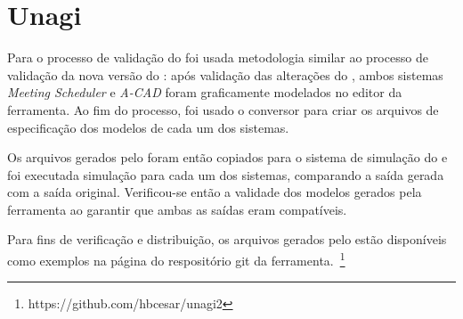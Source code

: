 \section{Unagi}

Para o processo de validação do \unagi foi usada metodologia similar ao processo de validação da nova versão do \zanshin: após validação das alterações do \framework, ambos sistemas \textit{Meeting Scheduler} e \textit{A-CAD} foram graficamente modelados no editor da ferramenta. Ao fim do processo, foi usado o conversor para criar os arquivos \xml de especificação dos modelos de cada um dos sistemas. 

Os arquivos gerados pelo \unagi foram então copiados para o sistema de simulação do \zanshin e foi executada simulação para cada um dos sistemas, comparando a saída gerada com a saída original. Verificou-se então a validade dos modelos gerados pela ferramenta ao garantir que ambas as saídas eram compatíveis.

Para fins de verificação e distribuição, os arquivos gerados pelo \unagi estão disponíveis como exemplos na página do respositório git da ferramenta.~\footnote{https://github.com/hbcesar/unagi2}